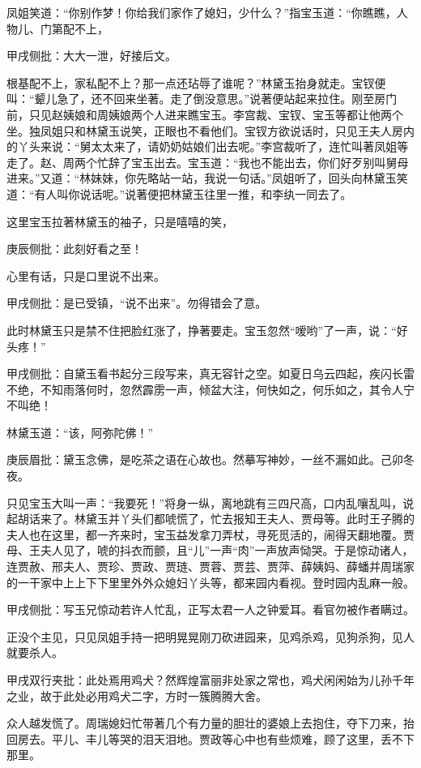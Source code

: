 \begin{parag}
    凤姐笑道：“你别作梦！你给我们家作了媳妇，少什么？”指宝玉道：“你瞧瞧，人物儿、门第配不上，\begin{note}甲戌侧批：大大一泄，好接后文。\end{note}根基配不上，家私配不上？那一点还玷辱了谁呢？”林黛玉抬身就走。宝钗便叫：“颦儿急了，还不回来坐著。走了倒没意思。”说著便站起来拉住。刚至房门前，只见赵姨娘和周姨娘两个人进来瞧宝玉。李宫裁、宝钗、宝玉等都让他两个坐。独凤姐只和林黛玉说笑，正眼也不看他们。宝钗方欲说话时，只见王夫人房内的丫头来说：“舅太太来了，请奶奶姑娘们出去呢。”李宫裁听了，连忙叫著凤姐等走了。赵、周两个忙辞了宝玉出去。宝玉道：“我也不能出去，你们好歹别叫舅母进来。”又道：“林妹妹，你先略站一站，我说一句话。”凤姐听了，回头向林黛玉笑道：“有人叫你说话呢。”说著便把林黛玉往里一推，和李纨一同去了。
\end{parag}


\begin{parag}
    这里宝玉拉著林黛玉的袖子，只是嘻嘻的笑，\begin{note}庚辰侧批：此刻好看之至！\end{note}心里有话，只是口里说不出来。\begin{note}甲戌侧批：是已受镇，“说不出来”。勿得错会了意。\end{note}此时林黛玉只是禁不住把脸红涨了，挣著要走。宝玉忽然“嗳哟”了一声，说：“好头疼！”\begin{note}甲戌侧批：自黛玉看书起分三段写来，真无容针之空。如夏日乌云四起，疾闪长雷不绝，不知雨落何时，忽然霹雳一声，倾盆大注，何快如之，何乐如之，其令人宁不叫绝！\end{note}林黛玉道：“该，阿弥陀佛！”\begin{note}庚辰眉批：黛玉念佛，是吃茶之语在心故也。然摹写神妙，一丝不漏如此。己卯冬夜。\end{note}只见宝玉大叫一声：“我要死！”将身一纵，离地跳有三四尺高，口内乱嚷乱叫，说起胡话来了。林黛玉并丫头们都唬慌了，忙去报知王夫人、贾母等。此时王子腾的夫人也在这里，都一齐来时，宝玉益发拿刀弄杖，寻死觅活的，闹得天翻地覆。贾母、王夫人见了，唬的抖衣而颤，且“儿”一声“肉”一声放声恸哭。于是惊动诸人，连贾赦、邢夫人、贾珍、贾政、贾琏、贾蓉、贾芸、贾萍、薛姨妈、薛蟠并周瑞家的一干家中上上下下里里外外众媳妇丫头等，都来园内看视。登时园内乱麻一般。\begin{note}甲戌侧批：写玉兄惊动若许人忙乱，正写太君一人之钟爱耳。看官勿被作者瞒过。\end{note}正没个主见，只见凤姐手持一把明晃晃刚刀砍进园来，见鸡杀鸡，见狗杀狗，见人就要杀人。\begin{note}甲戌双行夹批：此处焉用鸡犬？然辉煌富丽非处家之常也，鸡犬闲闲始为儿孙千年之业，故于此处必用鸡犬二字，方时一簇腾腾大舍。\end{note}众人越发慌了。周瑞媳妇忙带著几个有力量的胆壮的婆娘上去抱住，夺下刀来，抬回房去。平儿、丰儿等哭的泪天泪地。贾政等心中也有些烦难，顾了这里，丢不下那里。
\end{parag}


